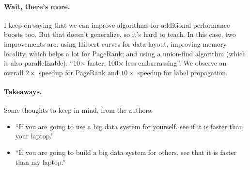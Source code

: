 \documentclass[a4paper]{report}
\begin{document}
\paragraph{Wait, there's more.} I keep on saying that we can improve algorithms for additional performance boosts too.
But that doesn't generalize, so it's hard to teach. In this case, two improvements are: using Hilbert curves
for data layout, improving memory locality, which helps a lot for PageRank; and using a union-find algorithm 
(which is also parallelizable). ``10$\times$ faster, 100$\times$ less embarrassing''.  We observe an overall
$2\times$ speedup for PageRank and $10\times$ speedup for label propagation.

\paragraph{Takeaways.} Some thoughts to keep in mind, from the authors:
\begin{itemize}
\item    ``If you are going to use a big data system for yourself, see if it is faster than your laptop.''
\item    ``If you are going to build a big data system for others, see that it is faster than my laptop.''
\end{itemize}







\end{document}

